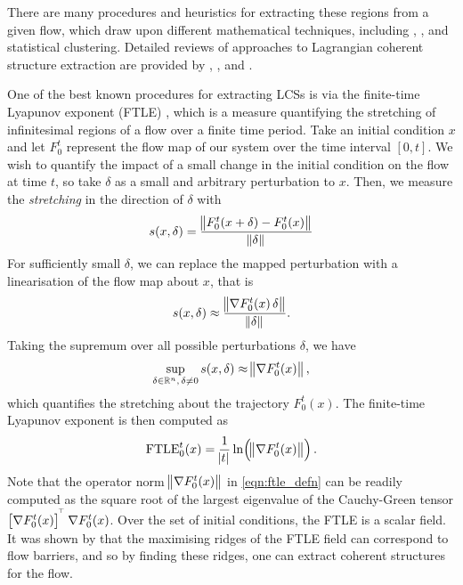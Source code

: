 There are many procedures and heuristics for extracting these regions from a given flow, which draw upon different mathematical techniques, including , , and statistical clustering.
Detailed reviews of approaches to Lagrangian coherent structure extraction are provided by \citet{BalasuriyaEtAl_2018_GeneralizedLagrangianCoherent}, \citet{HadjighasemEtAl_2017_CriticalComparisonLagrangian}, and \citet{PeacockDabiri_2010_IntroductionFocusIssue}.

One of the best known procedures for extracting LCSs is via the finite-time Lyapunov exponent (FTLE) \citep{ShaddenEtAl_2005_DefinitionPropertiesLagrangian}, which is a measure quantifying the stretching of infinitesimal regions of a flow over a finite time period.
Take an initial condition \(x\) and let \(F_0^t\) represent the flow map of our system over the time interval \([0,t]\).
We wish to quantify the impact of a small change in the initial condition on the flow at time \(t\), so take \(\delta\) as a small and arbitrary perturbation to \(x\).
Then, we measure the \emph{stretching} in the direction of \(\delta\) with
\[
	s\!\left(x, \delta\right) = \frac{\norm{F_0^t\!\left(x + \delta\right) - F_0^t\!\left(x\right)}}{\norm{\delta}}
\]
For sufficiently small \(\delta\), we can replace the mapped perturbation with a linearisation of the flow map about \(x\), that is
\[
	s\!\left(x, \delta\right) \approx \frac{\norm{\nabla F_0^t\!\left(x\right) \delta}}{\norm{\delta}}.
\]
Taking the supremum over all possible perturbations \(\delta\), we have
\[
	\sup_{\delta \in \mathbb{R}^n, \, \delta \neq 0}s\!\left(x, \delta\right) \approx \norm{\nabla F_0^t\!\left(x\right)},
\]
which quantifies the stretching about the trajectory \(F_0^t\!\left(x\right)\).
The finite-time Lyapunov exponent is then computed as
\begin{equation}
	\mathrm{FTLE}_0^t\!\left(x\right) = \frac{1}{\abs{t}}\ln\!\left(\norm{\nabla F_0^t\!\left(x\right)}\right).
	\label{eqn:ftle_defn}
\end{equation}
Note that the operator norm \(\norm{\nabla F_0^t\!\left(x\right)}\) in \cref{eqn:ftle_defn} can be readily computed as the square root of the largest eigenvalue of the Cauchy-Green tensor \(\left[\nabla F_0^t\!\left(x\right)\right]^{^{\!\top}}\nabla F_0^t\!\left(x\right)\).
Over the set of initial conditions, the FTLE is a scalar field.
It was shown by \citet{ShaddenEtAl_2005_DefinitionPropertiesLagrangian} that the maximising ridges of the FTLE field can correspond to flow barriers, and so by finding these ridges, one can extract coherent structures for the flow.

